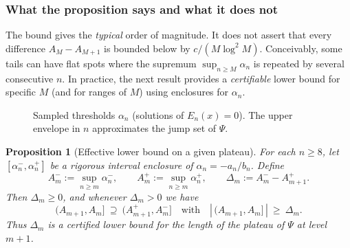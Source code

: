 \documentclass[10pt]{amsart}
\newtheorem{proposition}{Proposition}[section] %
\theoremstyle{definition} %
\numberwithin{equation}{section}
\begin{document}
\subsubsection*{What the proposition says and what it does not} 
The bound gives the \emph{typical} order of magnitude. It does not assert that every
difference \(A_M-A_{M+1}\) is bounded below by \(c/(M\log^2 M)\). Conceivably, some tails
can have flat spots where the supremum \(\sup_{n\ge M}\alpha_n\) is repeated by several
consecutive \(n\). In practice, the next result provides a \emph{certifiable} lower bound
for specific \(M\) (and for ranges of \(M\)) using enclosures for \(\alpha_n\).

\begin{figure}[h!]
\centering
{}
\caption{Sampled thresholds $\alpha_n$ (solutions of $E_n(x)=0$). The upper envelope in $n$ approximates the jump set of $\Psi$.}
\end{figure}


\begin{proposition}[Effective lower bound on a given plateau]\label{prop:effective-gap}
For each \(n\ge 8\), let \([\alpha_n^-,\alpha_n^+]\) be a rigorous interval enclosure
of \(\alpha_n=-a_n/b_n\). Define
\[
A_m^-:=\sup_{n\ge m}\alpha_n^-,\qquad A_m^+:=\sup_{n\ge m}\alpha_n^+,
\qquad \Delta_m:=A_m^- - A_{m+1}^+.
\]
Then \(\Delta_m\ge 0\), and whenever \(\Delta_m>0\) we have
\[
(A_{m+1},A_m]\ \supseteq\ (A_{m+1}^+,A_m^-]\quad\text{with}\quad
|\, (A_{m+1},A_m]\,|\ \ge\ \Delta_m.
\]
Thus \(\Delta_m\) is a certified lower bound for the length of the plateau of \(\Psi\) at level \(m+1\).
\end{proposition}
\end{document}
